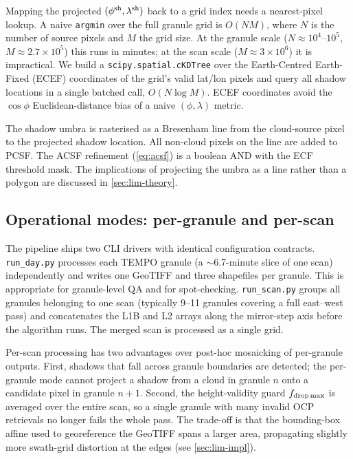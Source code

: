 \documentclass[11pt,a4paper]{article}
\newcommand{\code}[1]{\texttt{#1}}
\begin{document}
Mapping the projected $(\phi^{\rm sh}, \lambda^{\rm sh})$ back to a
grid index needs a nearest-pixel lookup. A naive \code{argmin} over the
full granule grid is $O(NM)$, where $N$ is the number of source pixels
and $M$ the grid size. At the granule scale
($N \approx 10^4$--$10^5$, $M \approx 2.7\times 10^5$) this runs in
minutes; at the scan scale ($M \approx 3\times 10^6$) it is impractical.
We build a \code{scipy.spatial.cKDTree} over the Earth-Centred
Earth-Fixed (ECEF) coordinates of the grid's valid lat/lon pixels and
query all shadow locations in a single batched call,
$O(N \log M)$. ECEF coordinates avoid the $\cos\phi$ Euclidean-distance
bias of a naive $(\phi, \lambda)$ metric.

The shadow umbra is rasterised as a Bresenham line from the
cloud-source pixel to the projected shadow location. All non-cloud
pixels on the line are added to PCSF. The ACSF refinement
(\cref{eq:acsf}) is a boolean AND with the ECF threshold mask. The
implications of projecting the umbra as a line rather than a polygon
are discussed in \cref{sec:lim-theory}.

\subsection{Operational modes: per-granule and per-scan}\label{sec:modes}

The pipeline ships two CLI drivers with identical configuration
contracts. \code{run\_day.py} processes each TEMPO granule (a
$\sim$6.7-minute slice of one scan) independently and writes one GeoTIFF
and three shapefiles per granule. This is appropriate for granule-level
QA and for spot-checking. \code{run\_scan.py} groups all granules
belonging to one scan (typically 9--11 granules covering a full
east--west pass) and concatenates the L1B and L2 arrays along the
mirror-step axis before the algorithm runs. The merged scan is processed
as a single grid.

Per-scan processing has two advantages over post-hoc mosaicking of
per-granule outputs. First, shadows that fall across granule boundaries
are detected; the per-granule mode cannot project a shadow from a cloud
in granule $n$ onto a candidate pixel in granule $n+1$. Second, the
height-validity guard $f_{\rm drop\,max}$ is averaged over the entire
scan, so a single granule with many invalid OCP retrievals no longer
fails the whole pass. The trade-off is that the bounding-box affine
used to georeference the GeoTIFF spans a larger area, propagating
slightly more swath-grid distortion at the edges (see
\cref{sec:lim-impl}).
\end{document}
